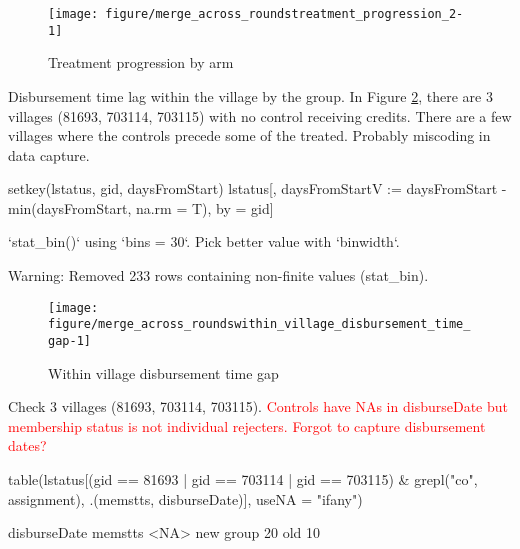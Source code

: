 \begin{Schunk}
\begin{figure}

{\centering \texttt{[image: figure/merge\_across\_roundstreatment\_progression\_2-1]} 

}

\caption[Treatment progression by arm]{Treatment progression by arm}\label{fig: treatment progression 2}
\end{figure}
\end{Schunk}

	Disbursement time lag within the village by the group. In \textsf{Figure \ref{fig: within village disbursement time gap}}, there are 3 villages (81693, 703114, 703115) with no control receiving credits. There are a few villages where the controls precede some of the treated. Probably miscoding in data capture.
\begin{Schunk}
\begin{Sinput}
setkey(lstatus, gid, daysFromStart)
lstatus[, daysFromStartV := daysFromStart - min(daysFromStart, na.rm = T), by = gid]
\end{Sinput}
\end{Schunk}
\begin{Schunk}
\begin{Soutput}
`stat_bin()` using `bins = 30`. Pick better value with `binwidth`.
\end{Soutput}
\begin{Soutput}
Warning: Removed 233 rows containing non-finite values (stat_bin).
\end{Soutput}
\begin{figure}

{\centering \texttt{[image: figure/merge\_across\_roundswithin\_village\_disbursement\_time\_gap-1]} 

}

\caption[Within village disbursement time gap]{Within village disbursement time gap}\label{fig: within village disbursement time gap}
\end{figure}
\end{Schunk}
Check 3 villages (81693, 703114, 703115). \textcolor{red}{Controls have NAs in \textsf{disburseDate} but membership status is not individual rejecters. Forgot to capture disbursement dates?}
\begin{Schunk}
\begin{Sinput}
table(lstatus[(gid == 81693 | gid == 703114 | gid == 703115) & 
	grepl("co", assignment), .(memstts, disburseDate)], useNA = "ifany")
\end{Sinput}
\begin{Soutput}
           disburseDate
memstts     <NA>
  new group   20
  old         10
\end{Soutput}
\end{Schunk}


